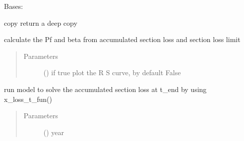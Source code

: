 \documentclass[letterpaper,10pt,english]{sphinxmanual}
\begin{document}

\begin{fulllineitems}
\label{\detokenize{corrosion:corrosion.Section_loss_Model}}
\sphinxAtStartPar
Bases: 

\begin{fulllineitems}
\label{\detokenize{corrosion:corrosion.Section_loss_Model.copy}}
\sphinxAtStartPar
copy return a deep copy

\end{fulllineitems}


\begin{fulllineitems}
\label{\detokenize{corrosion:corrosion.Section_loss_Model.postproc}}
\sphinxAtStartPar
calculate the Pf and beta from accumulated section loss and section loss limit
\begin{quote}\begin{description}
\item[{Parameters}] \leavevmode
\sphinxAtStartPar
{} (\sphinxstyleliteralemphasis{\sphinxupquote{, }}) \textendash{} if true plot the R S curve, by default False

\end{description}\end{quote}

\end{fulllineitems}


\begin{fulllineitems}
\label{\detokenize{corrosion:corrosion.Section_loss_Model.run}}
\sphinxAtStartPar
run model to solve the accumulated section loss at t\_end by using x\_loss\_t\_fun()
\begin{quote}\begin{description}
\item[{Parameters}] \leavevmode
\sphinxAtStartPar
{} (\sphinxstyleliteralemphasis{\sphinxupquote{, }}) \textendash{} year


\end{description}
\end{quote}
\end{fulllineitems}
\end{fulllineitems}
\end{document}
